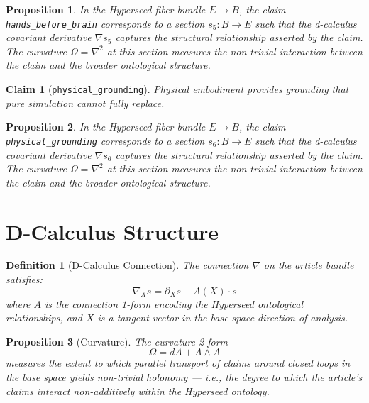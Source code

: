 \documentclass{article}
\newtheorem{claim}{Claim}
\newtheorem{definition}{Definition}
\newtheorem{proposition}{Proposition}
\begin{document}
\begin{proposition}
In the Hyperseed fiber bundle $E \to B$, the claim \texttt{hands_before_brain} corresponds to a section $s_5: B \to E$ such that the d-calculus covariant derivative $\nabla s_5$ captures the structural relationship asserted by the claim. The curvature $\Omega = \nabla^2$ at this section measures the non-trivial interaction between the claim and the broader ontological structure.
\end{proposition}

\begin{claim}[\texttt{physical_grounding}]
Physical embodiment provides grounding that pure simulation cannot fully replace.
\end{claim}

\begin{proposition}
In the Hyperseed fiber bundle $E \to B$, the claim \texttt{physical_grounding} corresponds to a section $s_6: B \to E$ such that the d-calculus covariant derivative $\nabla s_6$ captures the structural relationship asserted by the claim. The curvature $\Omega = \nabla^2$ at this section measures the non-trivial interaction between the claim and the broader ontological structure.
\end{proposition}

\section{D-Calculus Structure}

\begin{definition}[D-Calculus Connection]
The connection $\nabla$ on the article bundle satisfies:
\begin{equation}
  \nabla_X s = \partial_X s + A(X) \cdot s
\end{equation}
where $A$ is the connection 1-form encoding the Hyperseed ontological relationships, and $X$ is a tangent vector in the base space direction of analysis.
\end{definition}

\begin{proposition}[Curvature]
The curvature 2-form
\begin{equation}
  \Omega = dA + A \wedge A
\end{equation}
measures the extent to which parallel transport of claims around closed loops in the base space yields non-trivial holonomy --- i.e., the degree to which the article's claims interact non-additively within the Hyperseed ontology.
\end{proposition}
\end{document}
